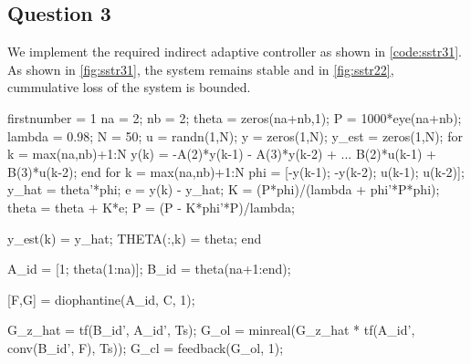 \FloatBarrier
\subsection{Question 3}
We implement the required indirect adaptive controller as shown in \autoref{code:sstr31}. As shown in \autoref{fig:sstr31}, the system remains stable and in \autoref{fig:sstr22}, cummulative loss of the system is bounded.


\begin{code}
	\begin{matlabcode}{firstnumber = 1}
na = 2; nb = 2; 
theta = zeros(na+nb,1); 
P = 1000*eye(na+nb); 
lambda = 0.98; 
N = 50;
u = randn(1,N); 
y = zeros(1,N); 
y_est = zeros(1,N); 
for k = max(na,nb)+1:N
y(k) = -A(2)*y(k-1) - A(3)*y(k-2) + ...
B(2)*u(k-1) + B(3)*u(k-2); 
end
for k = max(na,nb)+1:N
phi = [-y(k-1); -y(k-2); u(k-1); u(k-2)];
y_hat = theta'*phi;
e = y(k) - y_hat;
K = (P*phi)/(lambda + phi'*P*phi);
theta = theta + K*e;
P = (P - K*phi'*P)/lambda;

y_est(k) = y_hat;
THETA(:,k) = theta; 
end

A_id = [1; theta(1:na)];
B_id = theta(na+1:end);

[F,G] = diophantine(A_id, C, 1);

G_z_hat = tf(B_id', A_id', Ts);
G_ol = minreal(G_z_hat * tf(A_id', conv(B_id', F), Ts));
G_cl = feedback(G_ol, 1);
	\end{matlabcode}
	\label{code:sstr31}
\end{code}

